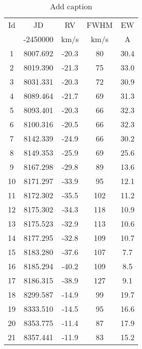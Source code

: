 \begin{table}[htbp]
  \centering
  \caption{Add caption}
    \begin{tabular}{|c|c|c|c|c|}
    \hline
    Id    & JD    & RV    & FWHM  & EW \bigstrut[t]\\
          & -2450000 & km/s  & km/s  & A \bigstrut[b]\\
    \hline
    1     & 8007.692 & -20.3 & 80    & 30.4 \bigstrut\\
    \hline
    2     & 8019.390 & -21.3 & 75    & 33.0 \bigstrut\\
    \hline
    3     & 8031.331 & -20.3 & 72    & 30.9 \bigstrut\\
    \hline
    4     & 8089.464 & -21.7 & 69    & 31.3 \bigstrut\\
    \hline
    5     & 8093.401 & -20.3 & 66    & 32.3 \bigstrut\\
    \hline
    6     & 8100.316 & -20.5 & 66    & 32.3 \bigstrut\\
    \hline
    7     & 8142.339 & -24.9 & 66    & 30.2 \bigstrut\\
    \hline
    8     & 8149.353 & -25.9 & 69    & 25.6 \bigstrut\\
    \hline
    9     & 8167.298 & -29.8 & 89    & 13.6 \bigstrut\\
    \hline
    10    & 8171.297 & -33.9 & 95    & 12.1 \bigstrut\\
    \hline
    11    & 8172.302 & -35.5 & 102   & 11.2 \bigstrut\\
    \hline
    12    & 8175.302 & -34.3 & 118   & 10.9 \bigstrut\\
    \hline
    13    & 8175.523 & -32.9 & 113   & 10.6 \bigstrut\\
    \hline
    14    & 8177.295 & -32.8 & 109   & 10.7 \bigstrut\\
    \hline
    15    & 8183.280 & -37.6 & 107   & 7.7 \bigstrut\\
    \hline
    16    & 8185.294 & -40.2 & 109   & 8.5 \bigstrut\\
    \hline
    17    & 8186.315 & -38.9 & 127   & 9.1 \bigstrut\\
    \hline
    18    & 8299.587 & -14.9 & 99    & 19.7 \bigstrut\\
    \hline
    19    & 8333.510 & -14.5 & 95    & 16.6 \bigstrut\\
    \hline
    20    & 8353.775 & -11.4 & 87    & 17.9 \bigstrut\\
    \hline
    21    & 8357.441 & -11.9 & 83    & 15.2 \bigstrut\\

\end{tabular}
\end{table}
